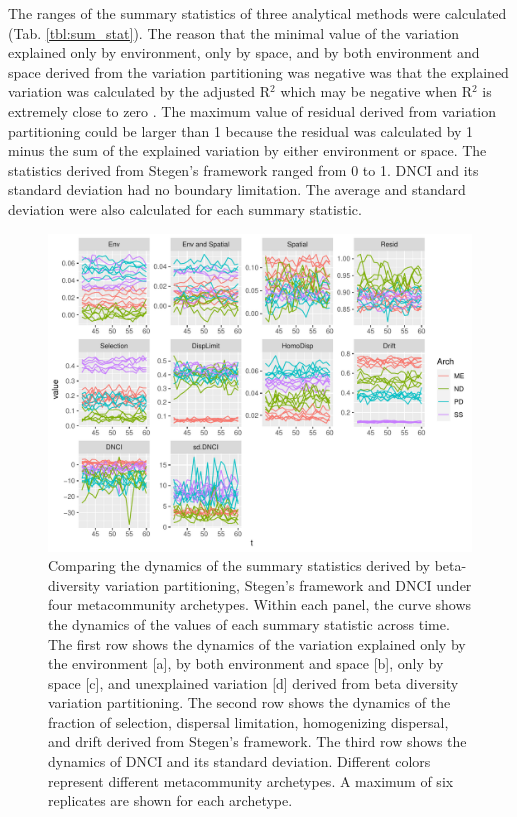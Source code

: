 The ranges of the summary statistics of three analytical methods were calculated (Tab. \ref{tbl:sum_stat}). The reason that the minimal value of the variation explained only by environment, only by space, and by both environment and space derived from the variation partitioning was negative was that the explained variation was calculated by the adjusted R$^2$ which may be negative when R$^2$ is extremely close to zero \citep[pp.~633]{legendre2012numerical}. The maximum value of residual derived from variation partitioning could be larger than 1 because the residual was calculated by 1 minus the sum of the explained variation by either environment or space. The statistics derived from Stegen's framework ranged from 0 to 1. DNCI and its standard deviation had no boundary limitation. The average and standard deviation were also calculated for each summary statistic.

\begin{figure}
	\centering
	\includegraphics[width=\textwidth]{./figures/Compare_archetypes_six_rep.pdf}
	\caption[Comparing the dynamics of the summary statistics derived by beta-diversity variation partitioning, Stegen's framework and DNCI under four metacommunity archetypes.]{\small
		Comparing the dynamics of the summary statistics derived by beta-diversity variation partitioning, Stegen's framework and DNCI under four metacommunity archetypes. Within each panel, the curve shows the dynamics of the values of each summary statistic across time. The first row shows the dynamics of the variation explained only by the environment [a], by both environment and space [b], only by space [c], and unexplained variation [d] derived from beta diversity variation partitioning. The second row shows the dynamics of the fraction of selection, dispersal limitation, homogenizing dispersal, and drift derived from Stegen's framework. The third row shows the dynamics of DNCI and its standard deviation. Different colors represent different metacommunity archetypes. A maximum of six replicates are shown for each archetype.}
	\label{fig:stat_comp}
\end{figure}

